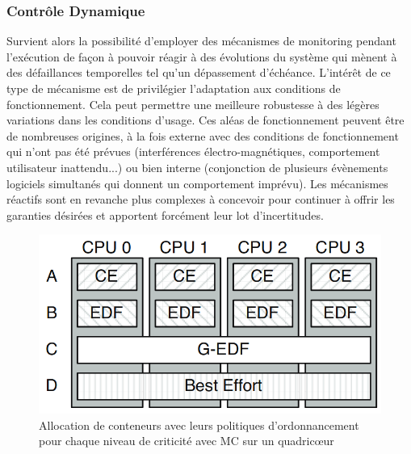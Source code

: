 \documentclass[french, a4paper, 11pt, twoside, pdftex]{StyleThese}
\begin{document}
    
	\subsubsection{Contrôle Dynamique}
    
     Survient alors la possibilité d'employer des mécanismes de monitoring pendant l'exécution de façon à pouvoir réagir à des évolutions du système qui mènent à des défaillances temporelles tel qu'un dépassement d'échéance. L'intérêt de ce type de mécanisme est de privilégier l'adaptation aux conditions de fonctionnement. Cela peut permettre une meilleure robustesse à des légères variations dans les conditions d'usage. Ces aléas de fonctionnement peuvent être de nombreuses origines, à la fois externe avec des conditions de fonctionnement qui n'ont pas été prévues (interférences électro-magnétiques, comportement utilisateur inattendu...) ou bien interne (conjonction de plusieurs évènements logiciels simultanés qui donnent un comportement imprévu). Les mécanismes réactifs sont en revanche plus complexes à concevoir pour continuer à offrir les garanties désirées et apportent forcément leur lot d'incertitudes. 
     
     \begin{figure}[h]
     	\centering
     	\includegraphics[width=0.7\linewidth]{schemas/MC2_scheduling_model}
     	\captionsetup{justification=centering} \caption{Allocation de conteneurs avec leurs politiques d'ordonnancement pour chaque niveau de criticité avec MC sur un quadricœur~\cite{herman_rtos_2012}}
     	\label{fig:mc2schedulingmodel}
     \end{figure}
 
\end{document}

